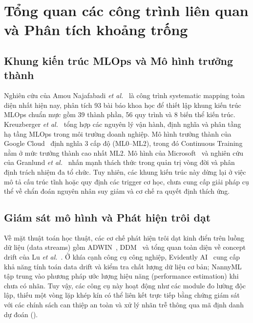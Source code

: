 \section{Tổng quan các công trình liên quan và Phân tích khoảng trống}

\subsection{Khung kiến trúc MLOps và Mô hình trưởng thành}
Nghiên cứu của Amou Najafabadi \textit{et al.}~\cite{najafabadi2026} là công trình systematic mapping toàn diện nhất hiện nay, phân tích 93 bài báo khoa học để thiết lập khung kiến trúc MLOps chuẩn mực gồm 39 thành phần, 56 quy trình và 8 biến thể kiến trúc. Kreuzberger \textit{et al.}~\cite{kreuzberger2023} tổng hợp các nguyên lý vận hành, định nghĩa và phân tầng hạ tầng MLOps trong môi trường doanh nghiệp. Mô hình trưởng thành của Google Cloud~\cite{google_mlops} định nghĩa 3 cấp độ (ML0--ML2), trong đó Continuous Training nằm ở mức trưởng thành cao nhất ML2. Mô hình của Microsoft~\cite{microsoft_mlops} và nghiên cứu của Granlund \textit{et al.}~\cite{granlund2021} nhấn mạnh thách thức trong quản trị vòng đời và phân định trách nhiệm đa tổ chức. Tuy nhiên, các khung kiến trúc này dừng lại ở việc mô tả cấu trúc tĩnh hoặc quy định các trigger cơ học, chưa cung cấp giải pháp cụ thể về chẩn đoán nguyên nhân suy giảm và cơ chế ra quyết định thích ứng.

\subsection{Giám sát mô hình và Phát hiện trôi dạt}
Về mặt thuật toán học thuật, các cơ chế phát hiện trôi dạt kinh điển trên luồng dữ liệu (data streams) gồm ADWIN~\cite{bifet2007}, DDM~\cite{gama2004} và tổng quan toàn diện về concept drift của Lu \textit{et al.}~\cite{lu2019}. Ở khía cạnh công cụ công nghiệp, Evidently AI~\cite{evidently} cung cấp khả năng tính toán data drift và kiểm tra chất lượng dữ liệu cơ bản; NannyML~\cite{nannyml} tập trung vào phương pháp ước lượng hiệu năng (performance estimation) khi chưa có nhãn. Tuy vậy, các công cụ này hoạt động như các module đo lường độc lập, thiếu một vòng lặp khép kín có thể liên kết trực tiếp bằng chứng giám sát với các chính sách can thiệp an toàn và xử lý nhãn trễ thông qua mã định danh dự đoán ().


